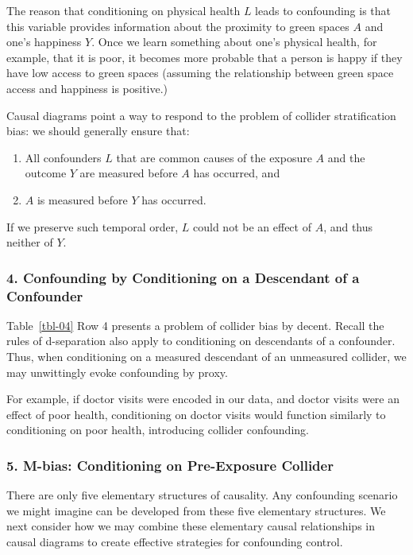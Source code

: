 \documentclass[
  singlecolumn]{article}
\begin{document}
The reason that conditioning on physical health \(L\) leads to
confounding is that this variable provides information about the
proximity to green spaces \(A\) and one's happiness \(Y\). Once we learn
something about one's physical health, for example, that it is poor, it
becomes more probable that a person is happy if they have low access to
green spaces (assuming the relationship between green space access and
happiness is positive.)

Causal diagrams point a way to respond to the problem of collider
stratification bias: we should generally ensure that:

\begin{enumerate}
\def\labelenumi{\arabic{enumi}.}
\item
  All confounders \(L\) that are common causes of the exposure \(A\) and
  the outcome \(Y\) are measured before \(A\) has occurred, and
\item
  \(A\) is measured before \(Y\) has occurred.
\end{enumerate}

If we preserve such temporal order, \(L\) could not be an effect of
\(A\), and thus neither of \(Y\).

\subsubsection{4. Confounding by Conditioning on a Descendant of a
Confounder}\label{confounding-by-conditioning-on-a-descendant-of-a-confounder}

Table~\ref{tbl-04} Row 4 presents a problem of collider bias by decent.
Recall the rules of d-separation also apply to conditioning on
descendants of a confounder. Thus, when conditioning on a measured
descendant of an unmeasured collider, we may unwittingly evoke
confounding by proxy.

For example, if doctor visits were encoded in our data, and doctor
visits were an effect of poor health, conditioning on doctor visits
would function similarly to conditioning on poor health, introducing
collider confounding.

\subsubsection{5. M-bias: Conditioning on Pre-Exposure
Collider}\label{m-bias-conditioning-on-pre-exposure-collider}

There are only five elementary structures of causality. Any confounding
scenario we might imagine can be developed from these five elementary
structures. We next consider how we may combine these elementary causal
relationships in causal diagrams to create effective strategies for
confounding control.
\end{document}
